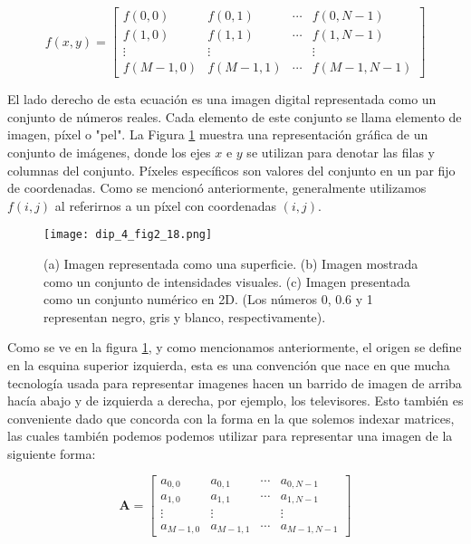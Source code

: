 $$
f(x, y)=\left[\begin{array}{cccc}
f(0,0) & f(0,1) & \cdots & f(0, N-1) \\
f(1,0) & f(1,1) & \cdots & f(1, N-1) \\
\vdots & \vdots & & \vdots \\
f(M-1,0) & f(M-1,1) & \cdots & f(M-1, N-1)
\end{array}\right]
$$

El lado derecho de esta ecuación es una imagen digital representada como un conjunto de números reales. Cada elemento de este conjunto se llama elemento de imagen, píxel o "pel". La Figura \ref{fig:dip_2_18} muestra una representación gráfica de un conjunto de imágenes, donde los ejes $x$ e $y$ se utilizan para denotar las filas y columnas del conjunto. Píxeles específicos son valores del conjunto en un par fijo de coordenadas. Como se mencionó anteriormente, generalmente utilizamos $f(i, j)$ al referirnos a un píxel con coordenadas $(i, j)$.


\begin{figure}[H]
    \centering
    \texttt{[image: dip\_4\_fig2\_18.png]}
    \caption{
        (a) Imagen representada como una superficie.
        (b) Imagen mostrada como un conjunto de intensidades visuales.
        (c) Imagen presentada como un conjunto numérico en 2D. (Los números 0, 0.6 y 1 representan negro, gris y blanco, respectivamente).}
    \label{fig:dip_2_18}
\end{figure}

Como se ve en la figura \ref{fig:dip_2_18}, y como mencionamos anteriormente, el origen se define en la esquina superior izquierda, esta es una convenci\'on que nace en que mucha tecnolog\'ia usada para representar imagenes hacen un barrido de imagen de arriba hacía abajo y de izquierda a derecha, por ejemplo, los televisores. Esto tambi\'en es conveniente dado que concorda con la forma en la que solemos indexar matrices, las cuales tambi\'en podemos podemos utilizar para representar una imagen  de la siguiente forma:

$$
\mathbf{A}=\left[\begin{array}{cccc}
a_{0,0} & a_{0,1} & \cdots & a_{0, N-1} \\
a_{1,0} & a_{1,1} & \cdots & a_{1, N-1} \\
\vdots & \vdots & & \vdots \\
a_{M-1,0} & a_{M-1,1} & \cdots & a_{M-1, N-1}
\end{array}\right]
$$

